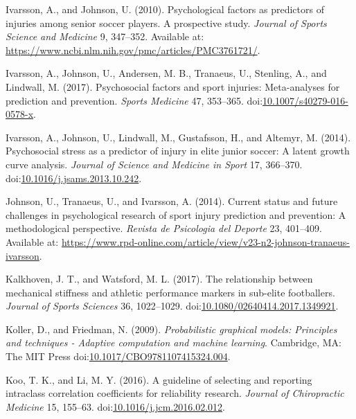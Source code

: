 \documentclass[
  english,
  man]{apa6}
\newlength{\cslhangindent}
\newenvironment{cslreferences}%
  {\setlength{\parindent}{0pt}%
  \everypar{\setlength{\hangindent}{\cslhangindent}}\ignorespaces}%
  {\par}
\begin{document}
\begin{cslreferences}
\leavevmode\hypertarget{ref-Ivarsson2010}{}%
Ivarsson, A., and Johnson, U. (2010). Psychological factors as predictors of injuries among senior soccer players. A prospective study. \emph{Journal of Sports Science and Medicine} 9, 347--352. Available at: \url{https://www.ncbi.nlm.nih.gov/pmc/articles/PMC3761721/}.

\leavevmode\hypertarget{ref-Ivarsson2017}{}%
Ivarsson, A., Johnson, U., Andersen, M. B., Tranaeus, U., Stenling, A., and Lindwall, M. (2017). Psychosocial factors and sport injuries: Meta-analyses for prediction and prevention. \emph{Sports Medicine} 47, 353--365. doi:\href{https://doi.org/10.1007/s40279-016-0578-x}{10.1007/s40279-016-0578-x}.

\leavevmode\hypertarget{ref-Ivarsson2014}{}%
Ivarsson, A., Johnson, U., Lindwall, M., Gustafsson, H., and Altemyr, M. (2014). Psychosocial stress as a predictor of injury in elite junior soccer: A latent growth curve analysis. \emph{Journal of Science and Medicine in Sport} 17, 366--370. doi:\href{https://doi.org/10.1016/j.jsams.2013.10.242}{10.1016/j.jsams.2013.10.242}.

\leavevmode\hypertarget{ref-Johnson2014}{}%
Johnson, U., Tranaeus, U., and Ivarsson, A. (2014). Current status and future challenges in psychological research of sport injury prediction and prevention: A methodological perspective. \emph{Revista de Psicologia del Deporte} 23, 401--409. Available at: \url{https://www.rpd-online.com/article/view/v23-n2-johnson-tranaeus-ivarsson}.

\leavevmode\hypertarget{ref-Kalkhoven2018}{}%
Kalkhoven, J. T., and Watsford, M. L. (2017). The relationship between mechanical stiffness and athletic performance markers in sub-elite footballers. \emph{Journal of Sports Sciences} 36, 1022--1029. doi:\href{https://doi.org/10.1080/02640414.2017.1349921}{10.1080/02640414.2017.1349921}.

\leavevmode\hypertarget{ref-Koller2009}{}%
Koller, D., and Friedman, N. (2009). \emph{Probabilistic graphical models: Principles and techniques - Adaptive computation and machine learning}. Cambridge, MA: The MIT Press doi:\href{https://doi.org/10.1017/CBO9781107415324.004}{10.1017/CBO9781107415324.004}.

\leavevmode\hypertarget{ref-Koo2016}{}%
Koo, T. K., and Li, M. Y. (2016). A guideline of selecting and reporting intraclass correlation coefficients for reliability research. \emph{Journal of Chiropractic Medicine} 15, 155--63. doi:\href{https://doi.org/10.1016/j.jcm.2016.02.012}{10.1016/j.jcm.2016.02.012}.


\end{cslreferences}
\end{document}
